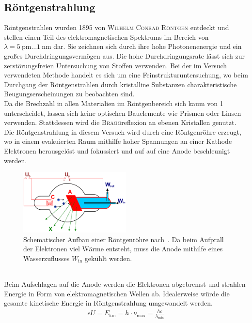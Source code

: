 \documentclass[a4paper,twoside,final]{article}
\begin{document}
\subsection{Röntgenstrahlung}
Röntgenstrahlen wurden 1895 von \textsc{Wilhelm Conrad Röntgen} entdeckt und stellen einen Teil des elektromagnetischen Spektrums im Bereich von $\lambda = \SI{5}{\pico \metre}\hdots \SI{1}{\nano\metre}$ dar. Sie zeichnen sich durch ihre hohe Photonenenergie und ein großes Durchdringungsvermögen aus. Die hohe Durchdringungsrate lässt sich zur zerstörungsfreien Untersuchung von Stoffen verwenden. Bei der im Versuch verwendeten Methode handelt es sich um eine Feinstrukturuntersuchung, wo beim Durchgang der Röntgenstrahlen durch kristalline Substanzen charakteristische Beugungserscheinungen zu beobachten sind.\\
Da die Brechzahl in allen Materialien im Röntgenbereich sich kaum von 1 unterscheidet, lassen sich keine optischen Bauelemente wie Prismen oder Linsen verwenden. Stattdessen wird die \textsc{Bragg}reflexion an ebenen Kristallen genutzt.\\
Die Röntgenstrahlung in diesem Versuch wird durch eine Röntgenröhre erzeugt, wo in einem evakuierten Raum mithilfe hoher Spannungen an einer Kathode Elektronen herausgelöst und fokussiert und auf auf eine Anode beschleunigt werden.
\begin{figure}[htp]
    \centering
    \includegraphics[width=0.5\textwidth]{Abbildungen/WaterCooledXrayTube.pdf}
    \caption{Schematischer Aufbau einer Röntgenröhre nach~\cite{Roentgenroehre}. Da beim Aufprall der Elektronen viel Wärme entsteht, muss die Anode mithilfe eines Wasserzuflusses $W_\text{in}$ gekühlt werden.}
    \label{fig:Roentgenroehre}
\end{figure}\\
Beim Aufschlagen auf die Anode werden die Elektronen abgebremst und strahlen Energie in Form von elektromagnetischen Wellen ab. Idealerweise würde die gesamte kinetische Energie in Röntgenstrahlung umgewandelt werden.
\begin{align}
  e U = E_\text{kin} = h \cdot \nu_\text{max} = \frac{hc}{\lambda_\text{min}}
\end{align}
\end{document}
